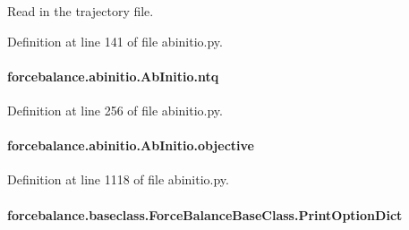 Read in the trajectory file. 



Definition at line 141 of file abinitio.\-py.

\hypertarget{classforcebalance_1_1abinitio_1_1AbInitio_af8a895f61ddea6b9ca2765ddbf309a75}{
\paragraph[{ntq}]{\setlength{\rightskip}{0pt plus 5cm}forcebalance.\-abinitio.\-Ab\-Initio.\-ntq\hspace{0.3cm}{\ttfamily [inherited]}}}\label{classforcebalance_1_1abinitio_1_1AbInitio_af8a895f61ddea6b9ca2765ddbf309a75}


Definition at line 256 of file abinitio.\-py.

\hypertarget{classforcebalance_1_1abinitio_1_1AbInitio_acbbd447b9f66bc4699992f3b64bb256d}{
\paragraph[{objective}]{\setlength{\rightskip}{0pt plus 5cm}forcebalance.\-abinitio.\-Ab\-Initio.\-objective\hspace{0.3cm}{\ttfamily [inherited]}}}\label{classforcebalance_1_1abinitio_1_1AbInitio_acbbd447b9f66bc4699992f3b64bb256d}


Definition at line 1118 of file abinitio.\-py.

\hypertarget{classforcebalance_1_1baseclass_1_1ForceBalanceBaseClass_a5c55e661e746d1a4443f4e0bc34ebe05}{
\paragraph[{Print\-Option\-Dict}]{\setlength{\rightskip}{0pt plus 5cm}forcebalance.\-baseclass.\-Force\-Balance\-Base\-Class.\-Print\-Option\-Dict\hspace{0.3cm}{\ttfamily [inherited]}}}\label{classforcebalance_1_1baseclass_1_1ForceBalanceBaseClass_a5c55e661e746d1a4443f4e0bc34ebe05}



